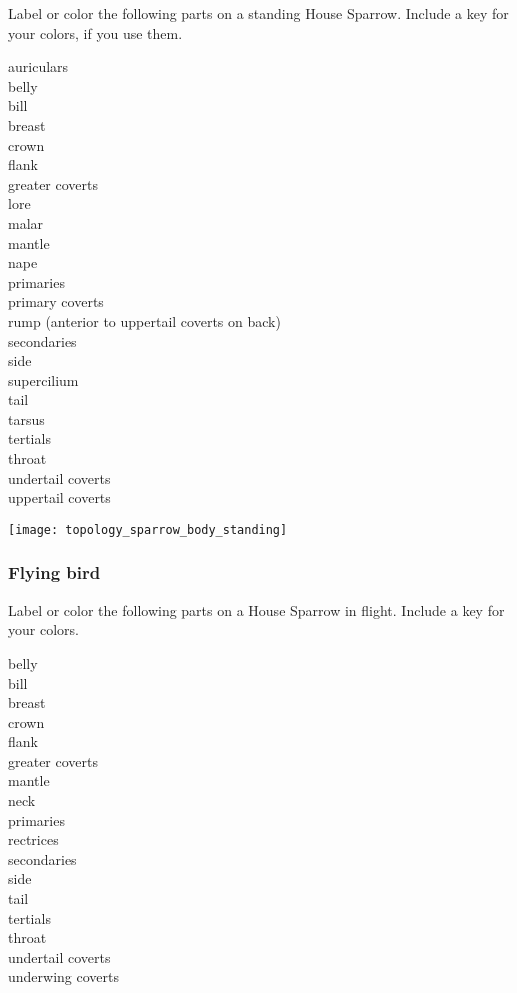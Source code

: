 \documentclass[10pt]{article}
\begin{document}
Label or color the following parts on a standing House Sparrow. Include a key for your colors, if you use them.

\begin{multicols}{3}
auriculars\\
belly\\
bill\\
breast\\
crown\\
flank\\
greater coverts\\
lore\\
malar\\
mantle\\
nape\\
primaries\\
primary coverts\\
rump (anterior to uppertail\newline
\phantom{M}coverts on back)\\
secondaries\\
side\\
supercilium\\
tail\\
tarsus\\
tertials\\
throat\\
undertail coverts\\
uppertail coverts
\end{multicols}

\begin{center}
\texttt{[image: topology\_sparrow\_body\_standing]}
\end{center}

\newpage


\subsubsection*{Flying bird}

Label or color the following parts on a House Sparrow in flight. Include a key for your colors.


\begin{multicols}{3}
belly\\
bill\\
breast\\
crown\\
flank\\
greater coverts\\
mantle\\
neck\\
primaries\\
rectrices\\
secondaries\\
side\\
tail\\
tertials\\
throat\\
undertail coverts\\
underwing coverts
\end{multicols}
\end{document}
